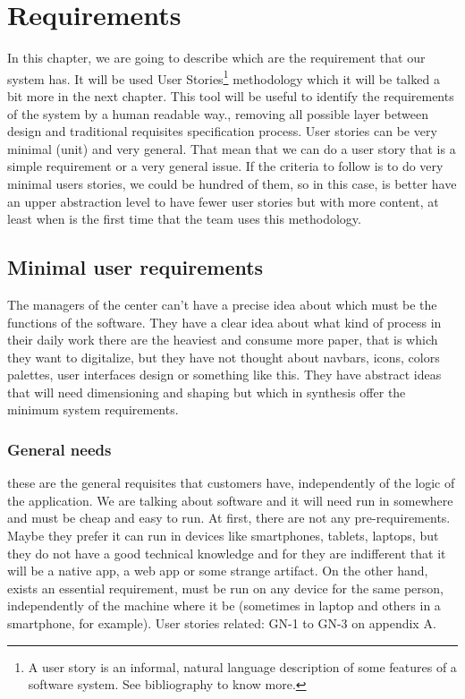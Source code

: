 \chapter{Requirements}

In this chapter, we are going to describe which are the requirement that our system has.
It will be used User Stories\footnote{A user story is an informal, natural language
description of some features of a software system. See bibliography to know more.}
methodology which it will be talked a bit more in the next chapter.
This tool will be useful to identify the requirements of the system by a
human readable way., removing all possible layer between design and traditional
requisites specification process.
\intro
User stories can be very minimal (unit) and very general. That mean that we
can do a user story that is a simple requirement or a very general issue.
If the criteria to follow is to do very minimal users stories, we could be
hundred of them, so in this case, is better have an upper abstraction level
to have fewer user stories but with more content, at least when is the
first time that the team uses this methodology.

\section{Minimal user requirements}

The managers of the center can't have a precise idea about which must be the
functions of the software. They have a clear idea about what kind of process in
their daily work there are the heaviest and consume more paper, that is which
they want to digitalize, but they have not thought about navbars, icons, colors palettes,
user interfaces design or something like this.  They have abstract ideas that will
need dimensioning and shaping but which in synthesis offer the minimum system requirements.

\subsection{General needs}

these are the general requisites that customers have, independently of the logic of the application.
We are talking about software and it will need run in somewhere and must be cheap
and easy to run.
At first, there are not any pre-requirements. Maybe they prefer it can run in
devices like smartphones, tablets, laptops,
but they do not have a good technical knowledge and for they are indifferent that
it will be a native app, a web app or some strange artifact.
\intro
On the other hand, exists an essential requirement, must be run on any device for
the same person, independently of the machine where it be (sometimes in laptop
and others in a smartphone, for example).
\intro
User stories related: GN-1 to GN-3 on appendix A.



